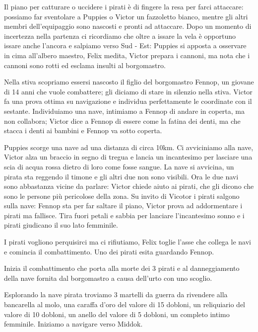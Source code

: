 \documentclass[letterpaper,twocolumn,openany,justified,nodeprecatedcode]{dndbook}
\begin{document}
Il piano per catturare o uccidere i pirati è di fingere la resa per farci attaccare: possiamo far sventolare a Puppies o Victor un fazzoletto bianco, mentre gli altri membri dell'equipaggio sono nascosti e pronti ad attaccare. Dopo un momento di incertezza nella partenza ci ricordiamo che oltre a issare la vela è opportuno issare anche l'ancora e salpiamo verso Sud - Est: Puppies si apposta a osservare in cima all'albero maestro, Felix medita, Victor prepara i cannoni, ma nota che i cannoni sono rotti ed esclama insulti al borgomastro.

Nella stiva scopriamo essersi nascosto il figlio del borgomastro Fennop, un giovane di 14 anni che vuole combattere; gli diciamo di stare in silenzio nella stiva. Victor fa una prova ottima su navigazione e individua perfettamente le coordinate con il sestante. Individuiamo una nave, intimiamo a Fennop di andare in coperta, ma non collabora; Victor dice a Fennop di essere come la fatina dei denti, ma che stacca i denti ai bambini e Fennop va sotto coperta.

Puppies scorge una nave ad una distanza di circa 10km. Ci avviciniamo alla nave, Victor alza un braccio in segno di tregua e lancia un incantesimo per lasciare una scia di acqua rossa dietro di loro come fosse sangue. La nave si avvicina, un pirata sta reggendo il timone e gli altri due non sono visibili. Ora le due navi sono abbastanza vicine da parlare: Victor chiede aiuto ai pirati, che gli dicono che sono le persone più pericolose della zona. Su invito di Vicotor i pirati salgono sulla nave: Fennop sta per far saltare il piano, Victor prova ad addormentare i pirati ma fallisce. Tira fuori petali e sabbia per lanciare l'incantesimo sonno e i pirati giudicano il suo lato femminile.

I pirati vogliono perquisirci ma ci rifiutiamo, Felix toglie l'asse che collega le navi e comincia il combattimento.
Uno dei pirati esita guardando Fennop.

Inizia il combattimento che porta alla morte dei 3 pirati e al danneggiamento della nave fornita dal borgomastro a causa dell'urto con uno scoglio.

Esplorando la nave pirata troviamo 3 martelli da guerra da rivendere alla bancarella al molo, una caraffa d'oro del valore di 15 dobloni,  un reliquiario del valore di 10 dobloni, un anello del valore di 5 dobloni, un completo intimo femminile. Iniziamo a navigare verso Middok.
\end{document}
